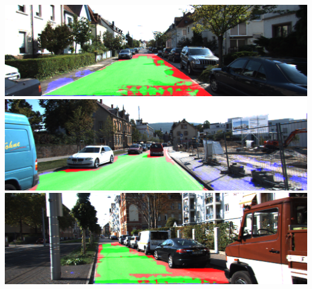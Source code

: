 \includegraphics[scale=0.2]{figures/kitty_eval/Persp_uu_road_000020.png}
\includegraphics[scale=0.2]{figures/kitty_eval/Persp_uu_road_000027.png}
\includegraphics[scale=0.2]{figures/kitty_eval/Persp_uu_road_000082.png}



